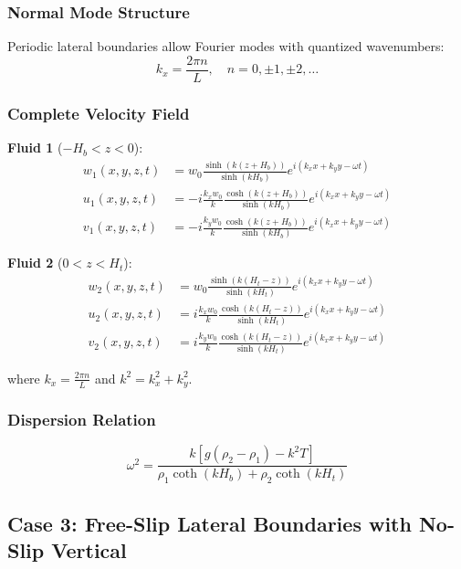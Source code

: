 \documentclass[12pt,a4paper]{article}
\begin{document}
\subsubsection{Normal Mode Structure}

Periodic lateral boundaries allow Fourier modes with quantized wavenumbers:
\begin{equation}
k_x = \frac{2\pi n}{L}, \quad n = 0, \pm 1, \pm 2, \ldots
\end{equation}

\subsubsection{Complete Velocity Field}

\textbf{Fluid 1} ($-H_b < z < 0$):
\begin{align}
w_1(x,y,z,t) &= w_0 \frac{\sinh(k(z + H_b))}{\sinh(kH_b)} e^{i(k_x x + k_y y - \omega t)} \\
u_1(x,y,z,t) &= -i\frac{k_x w_0}{k} \frac{\cosh(k(z + H_b))}{\sinh(kH_b)} e^{i(k_x x + k_y y - \omega t)} \\
v_1(x,y,z,t) &= -i\frac{k_y w_0}{k} \frac{\cosh(k(z + H_b))}{\sinh(kH_b)} e^{i(k_x x + k_y y - \omega t)}
\end{align}

\textbf{Fluid 2} ($0 < z < H_t$):
\begin{align}
w_2(x,y,z,t) &= w_0 \frac{\sinh(k(H_t - z))}{\sinh(kH_t)} e^{i(k_x x + k_y y - \omega t)} \\
u_2(x,y,z,t) &= i\frac{k_x w_0}{k} \frac{\cosh(k(H_t - z))}{\sinh(kH_t)} e^{i(k_x x + k_y y - \omega t)} \\
v_2(x,y,z,t) &= i\frac{k_y w_0}{k} \frac{\cosh(k(H_t - z))}{\sinh(kH_t)} e^{i(k_x x + k_y y - \omega t)}
\end{align}

where $k_x = \frac{2\pi n}{L}$ and $k^2 = k_x^2 + k_y^2$.

\subsubsection{Dispersion Relation}
\begin{equation}
\omega^2 = \frac{k[g(\rho_2 - \rho_1) - k^2T]}{\rho_1\coth(kH_b) + \rho_2\coth(kH_t)}
\end{equation}

\subsection{Case 3: Free-Slip Lateral Boundaries with No-Slip Vertical}
\end{document}
